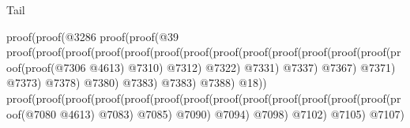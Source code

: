 \begin{lexlean}{Tail}
\begin{coremodule}
                                                      proof(proof(@3286
                                                            proof(proof(@39
                                                                  proof(proof(proof(proof(proof(proof(proof(proof(proof(proof(proof(proof(proof(proof(proof(@7306
                                                                                                  @4613)
                                                                                                @7310)
                                                                                              @7312)
                                                                                            @7322)
                                                                                          @7331)
                                                                                        @7337)
                                                                                      @7367)
                                                                                    @7371)
                                                                                  @7373)
                                                                                @7378)
                                                                              @7380)
                                                                            @7383)
                                                                          @7383)
                                                                        @7388)
                                                                      @18))
                                                                proof(proof(proof(proof(proof(proof(proof(proof(proof(proof(proof(proof(proof(proof(@7080
                                                                                              @4613)
                                                                                            @7083)
                                                                                          @7085)
                                                                                        @7090)
                                                                                      @7094)
                                                                                    @7098)
                                                                                  @7102)
                                                                                @7105)
                                                                              @7107)

\end{coremodule}
\end{lexlean}
